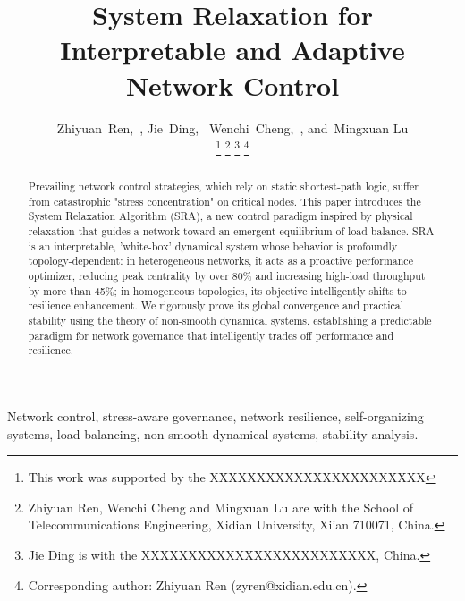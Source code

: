 \documentclass[journal]{IEEEtran}
\begin{document}
\title{System Relaxation for Interpretable and Adaptive Network Control}


\author{Zhiyuan~Ren,~,
       Jie~Ding,
        ~Wenchi~Cheng,~,
        and~Mingxuan Lu
        
\thanks{This work was supported by the XXXXXXXXXXXXXXXXXXXXXXX}%
\thanks{Zhiyuan Ren, Wenchi Cheng and Mingxuan Lu are with the School of Telecommunications Engineering, Xidian University, Xi'an 710071, China.}%
\thanks{Jie Ding is with the XXXXXXXXXXXXXXXXXXXXXXXXX, China.}%
\thanks{Corresponding author: Zhiyuan Ren (zyren@xidian.edu.cn).}%
}





\maketitle


\begin{abstract}
Prevailing network control strategies, which rely on static shortest-path logic, suffer from catastrophic "stress concentration" on critical nodes. This paper introduces the System Relaxation Algorithm (SRA), a new control paradigm inspired by physical relaxation that guides a network toward an emergent equilibrium of load balance. SRA is an interpretable, 'white-box' dynamical system whose behavior is profoundly topology-dependent: in heterogeneous networks, it acts as a proactive performance optimizer, reducing peak centrality by over 80\% and increasing high-load throughput by more than 45\%; in homogeneous topologies, its objective intelligently shifts to resilience enhancement. We rigorously prove its global convergence and practical stability using the theory of non-smooth dynamical systems, establishing a predictable paradigm for network governance that intelligently trades off performance and resilience.
\end{abstract}

\begin{IEEEkeywords}
Network control, stress-aware governance, network resilience, self-organizing systems, load balancing, non-smooth dynamical systems, stability analysis.
\end{IEEEkeywords}
\end{document}
